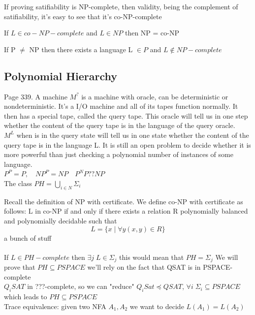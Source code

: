 \begin{theorem}
    If proving satifiability is NP-complete, then validity, being the complement of satifiability, it's easy to see that it's co-NP-complete
\end{theorem}

\begin{theorem}
    If $L \in co-NP-complete$ and $L \in NP$ then NP = co-NP
\end{theorem}

\begin{theorem}
    If P $\neq$ NP then there exists a language L $\in P$ and $L \notin NP-complete$
\end{theorem}

\subsection{Polynomial Hierarchy}
\begin{definition}
    Page 339. A machine $M^?$ is a machine with oracle, can be deterministic or nondeterministic. It's a I/O machine and all of its tapes function normally. It then has a special tape, called the query tape. This oracle will tell us in one step whether the content of the query tape is in the language of the query oracle.\\
    $M^L$ when is in the query state will tell us in one state whether the content of the query tape is in the language L. It is still an open problem to decide whether it is more powerful than just checking a polynomial number of instances of some language.\\
    $P^P=P, \quad NP^P = NP \quad P^NP ?? NP$\\
    The class $PH = \bigcup_{i\in N}\Sigma_i$
\end{definition}
Recall the definition of NP with certificate. We define co-NP with certificate as follows: L in co-NP if and only if there exists a relation R polynomially balanced and polynomially decidable such that 
\[ 
    L = \{x \mid \forall y (x,y) \in R\} 
\]
a bunch of stuff \\\\
If $L \in PH-complete$ then $\exists j \; L \in \Sigma_j$ this would mean that $PH=\Sigma_j$
We will prove that $PH \subseteq PSPACE$ we'll rely on the fact that QSAT is in PSPACE-complete\\
$Q_iSAT$ in ???-complete, so we can "reduce" $Q_iSat \preceq QSAT$, $\forall i \; \Sigma_i \subseteq PSPACE$ which leads to $PH \subseteq PSPACE$\\
Trace equivalence: given two NFA $A_1, A_2$ we want to decide $L(A_1) = L(A_2)$

